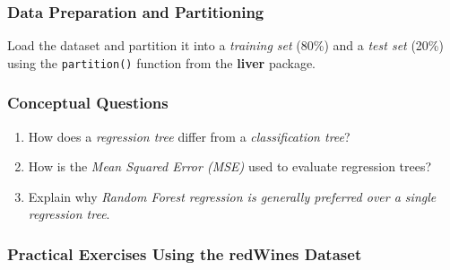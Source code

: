 \documentclass[
  11pt,
]{book}
\makeatletter
\newenvironment{Shaded}{}{}
\newcommand{\AttributeTok}[1]{#1}
\newcommand{\DecValTok}[1]{#1}
\newcommand{\FloatTok}[1]{#1}
\newcommand{\FunctionTok}[1]{#1}
\newcommand{\NormalTok}[1]{#1}
\newcommand{\OtherTok}[1]{\textcolor[rgb]{0.39,0.39,0.39}{#1}}
\newcommand{\SpecialCharTok}[1]{\textcolor[rgb]{0.39,0.39,0.39}{#1}}
\newcommand{\StringTok}[1]{\textcolor[rgb]{0.39,0.39,0.39}{#1}}
\providecommand{\tightlist}{%
  \setlength{\itemsep}{0pt}\setlength{\parskip}{0pt}}
\newenvironment{kframe}{%
\medskip{}
\setlength{\fboxsep}{.8em}
 \def\at@end@of@kframe{}%
 \ifinner\ifhmode%
  \def\at@end@of@kframe{\end{minipage}}%
  \begin{minipage}{\columnwidth}%
 \fi\fi%
 \def\FrameCommand##1{\hskip\@totalleftmargin \hskip-\fboxsep
 \colorbox{shadecolor}{##1}\hskip-\fboxsep
     \hskip-\linewidth \hskip-\@totalleftmargin \hskip\columnwidth}%
 \MakeFramed {\advance\hsize-\width
   \@totalleftmargin\z@ \linewidth\hsize
   \@setminipage}}%
 {\par\unskip\endMakeFramed%
 \at@end@of@kframe}
\renewenvironment{Shaded}{\begin{kframe}}{\end{kframe}}
\theoremstyle{definition}
\theoremstyle{definition}
\theoremstyle{definition}
\theoremstyle{definition}
\theoremstyle{remark}
\makeatother
\begin{document}
\subsubsection*{Data Preparation and Partitioning}\label{data-preparation-and-partitioning-1}


Load the dataset and partition it into a \emph{training set} (80\%) and a \emph{test set} (20\%) using the \texttt{partition()} function from the \textbf{liver} package.

\begin{Shaded}
\end{Shaded}

\subsubsection*{Conceptual Questions}\label{conceptual-questions-9}


\begin{enumerate}
\def\labelenumi{\arabic{enumi}.}
\setcounter{enumi}{37}
\tightlist
\item
  How does a \emph{regression tree} differ from a \emph{classification tree}?\\
\item
  How is the \emph{Mean Squared Error (MSE)} used to evaluate regression trees?\\
\item
  Explain why \emph{Random Forest regression is generally preferred over a single regression tree}.
\end{enumerate}

\subsubsection*{Practical Exercises Using the redWines Dataset}\label{practical-exercises-using-the-redwines-dataset}
\end{document}
